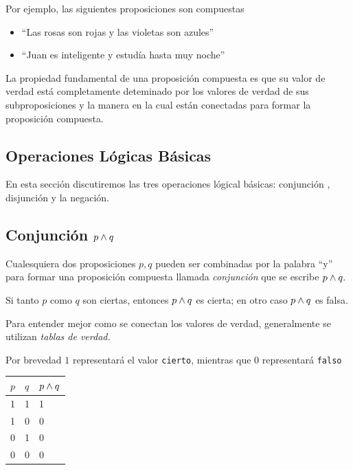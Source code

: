     Por ejemplo, las siguientes proposiciones son compuestas
    \begin{itemize}
        \item ``Las rosas son rojas y las violetas son azules''
        \item ``Juan es inteligente y estud\'ia hasta muy noche''
    \end{itemize}
    



    La propiedad fundamental de una proposici\'on compuesta es que su valor de verdad est\'a completamente deteminado por los valores de verdad de sus subproposiciones y la manera en la cual est\'an conectadas para formar la proposici\'on compuesta. 


\subsection{Operaciones L\'ogicas B\'asicas}


    En esta secci\'on discutiremos las tres operaciones l\'ogical b\'asicas: conjunci\'on , disjunci\'on  y la negaci\'on.


\subsection{Conjunci\'on $p \wedge q$}


    Cualesquiera dos proposiciones $p,q$ pueden ser combinadas por la palabra ``y'' para formar una proposici\'on compuesta llamada \emph{conjunci\'on} que se escribe $p\wedge q.$



    \begin{defn}
        Si tanto $p$ como $q$ son ciertas, entonces $p \wedge q$ es cierta; en otro caso $p\wedge q$ es falsa.
    \end{defn}
    



    \begin{rem}
        Para entender mejor como se conectan los valores de verdad, generalmente se utilizan \emph{tablas de verdad.}  
        
        Por brevedad $1$ representar\'a el valor \texttt{cierto}, mientras que $0$ representar\'a \texttt{falso}
    \end{rem}
    



    \begin{tdv}[Conjunci\'on]\hfill
        \label{tdv:and}
        \begin{center}
            \begin{tabular}{|l|l|l|}\hline
                $p$ & $q$ & $p \wedge q$\\\hline
                1 & 1 & 1\\\hline
                1 & 0 & 0\\\hline
                0 & 1 & 0\\\hline
                0 & 0 & 0\\\hline
            \end{tabular}
        \end{center}        
    \end{tdv}
    



